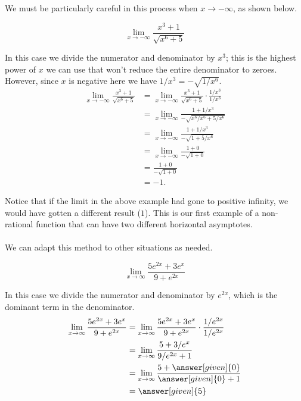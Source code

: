 \documentclass{ximera}
\begin{document}
We must be particularly careful in this process when $x\rightarrow -\infty$, as shown below.

\begin{example}

\[
\lim_{x\to -\infty} \frac{x^3+1}{\sqrt{x^6+5}}
\]
\begin{explanation}
In this case we divide the numerator and denominator by $x^3$; this is the highest power of $x$ we can use that won't reduce the entire denominator to zeroes. However, since $x$ is negative here we have $1/x^3=-\sqrt{1/x^6}$.
\begin{align*}
\lim_{x\to -\infty} \frac{x^3+1}{\sqrt{x^6+5}} &= \lim_{x\to -\infty} \frac{x^3+1}{\sqrt{x^6+5}} \cdot \frac{1/x^3}{1/x^3}\\
&= \lim_{x\to -\infty} \frac{1+1/x^3}{-\sqrt{x^6/x^6+5/x^6}}\\
&= \lim_{x\to -\infty} \frac{1+1/x^3}{-\sqrt{1+5/x^6}}\\
&= \lim_{x\to -\infty}\frac{1+0}{-\sqrt{1+0}}\\
&= \frac{1+0}{-\sqrt{1+0}}\\
&= -1.
\end{align*}
\end{explanation}
\end{example}

Notice that if the limit in the above example had gone to positive infinity, we would have gotten a different result ($1$). This is our first example of a non-rational function that can have two different horizontal asymptotes. 
\\
\\We can adapt this method to other situations as needed.

\begin{example}
$$\displaystyle\lim_{x\rightarrow \infty}\frac{5e^{2x}+3e^x}{9+e^{2x}}$$

In this case we divide the numerator and denominator by $e^{2x}$, which is the dominant term in the denominator.
\begin{align*}
\displaystyle\lim_{x\rightarrow \infty}\frac{5e^{2x}+3e^x}{9+e^{2x}}&=\lim_{x\rightarrow \infty}\frac{5e^{2x}+3e^x}{9+e^{2x}}\cdot\frac{1/e^{2x}}{1/e^{2x}}\\
&=\lim_{x\rightarrow \infty}\frac{5+3/e^x}{9/e^{2x}+1}\\
&=\lim_{x\rightarrow \infty}\frac{5+\answer[given]{0}}{\answer[given]{0}+1}\\
&=\answer[given]{5}\end{align*}

\end{example}
\end{document}

